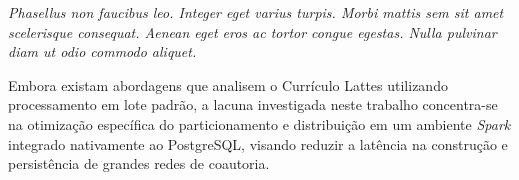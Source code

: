 \textit{Phasellus non faucibus leo. Integer eget varius turpis. Morbi mattis sem sit amet scelerisque consequat. Aenean eget eros ac tortor congue egestas. Nulla pulvinar diam ut odio commodo aliquet.}

Embora existam abordagens que analisem o Currículo Lattes utilizando processamento em lote padrão, a lacuna investigada neste trabalho concentra-se na otimização específica do particionamento e distribuição em um ambiente \textit{Spark} integrado nativamente ao PostgreSQL, visando reduzir a latência na construção e persistência de grandes redes de coautoria.
